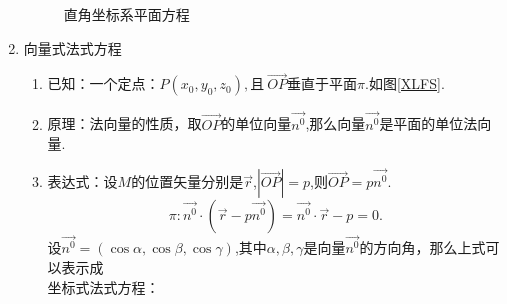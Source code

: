 \begin{enumerate}[\large1.]
\begin{figure}[h]
{\begin{minipage}[b]{0.5\linewidth}
				\label{DFS}
			\end{minipage}%
		}%
		\caption{直角坐标系平面方程}
	\end{figure}
	\label{平面的向量式法式方程}
	\item  {\color{dy}\large 向量式法式方程}
	\begin{enumerate}[]
		\item 已知：{\color{dl}一个定点}：$P(x_0,y_0,z_0),$且{\color{dl}$\ \overrightarrow{OP}$垂直于平面$\pi $}.如图\ref{XLFS}.
		\item 原理：法向量的性质，取$\overrightarrow{OP}$的单位向量$\overrightarrow{n^0}$,那么向量$\overrightarrow{n^0}$是平面的单位法向量. 
		\item 表达式：设$M$的位置矢量分别是$\overrightarrow{r}$,$\left|\overrightarrow{OP} \right| =p$,则$\overrightarrow{OP} =p\overrightarrow{n^0}.$
		\begin{equation}
		\pi :\overrightarrow{n^0}\cdot \left(\overrightarrow{r}-p\overrightarrow{n^0} \right) =\overrightarrow{n^0}\cdot \overrightarrow{r}-p=0.
		\end{equation}
		\qquad 设$\overrightarrow{n^0}=\left(\cos \alpha ,\cos \beta ,\cos \gamma \right) $,其中$\alpha , \beta , \gamma$是向量$\overrightarrow{n^0}$的方向角，那么上式可以表示成\\
		{\color{dy}坐标式法式方程}：
		\begin{equation}

\end{equation}
\end{enumerate}
\end{enumerate}
